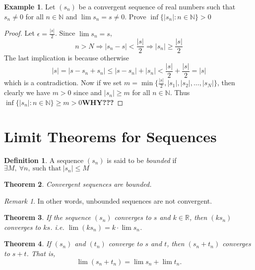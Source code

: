 \documentclass[12pt, lettersize]{book}
\theoremstyle{plain}
\newtheorem{thm}{Theorem}[section]
\theoremstyle{definition}
\newtheorem{dfn}[thm]{Definition}
\newtheorem*{eg}{Example}
\theoremstyle{remark}
\newtheorem*{rem}{Remark}
\begin{document}
	\begin{eg}
		Let $(s_n)$ be a convergent sequence of real numbers such that $s_n\neq0$ for all $n\in \mathbb{N}$ and $\lim s_n=s
		\neq0$. Prove $\inf\{|s_n|: n\in\mathbb{N}\}>0$
	\end{eg}
	\begin{proof}
		Let $\epsilon=\frac{|s|}{2}$. Since $\lim s_n=s$,
		\begin{displaymath}
			n>N \Rightarrow |s_n-s|<\frac{|s|}{2} \Rightarrow |s_n|\geq\frac{|s|}{2}
		\end{displaymath}
		The last implication is because otherwise 
		\begin{displaymath}
			|s|=|s-s_n+s_n|\leq|s-s_n|+|s_n|<\frac{|s|}{2}+\frac{|s|}{2}=|s|
		\end{displaymath}
		which is a contradiction. Now if we set $m=\min\{\frac{|s|}{2},|s_1|,|s_2|,\dots,|s_N|\}$, then clearly we have
		$m>0$ since and $|s_n|\geq m$ for all $n\in \mathbb{N}$. Thus $\inf\{|s_n|: n\in\mathbb{N}\}\geq m>0$\textbf{WHY???} 
	\end{proof}
	\newpage
	
	\section{Limit Theorems for Sequences}
	\begin{dfn}\label{def:bound}
		A sequence $(s_n)$ is said to be \emph{bounded} if $\exists M,\ \forall n,\ \text{such that}\ |s_n|\leq M$
	\end{dfn}
	
	\begin{thm}\label{def:convergence is bounded}
		Convergent sequences are bounded.
	\end{thm}
	\begin{rem}
		In other words, unbounded sequences are not convergent.
	\end{rem}
	
	\begin{thm}
		If the sequence $(s_n)$ converges to $s$ and $k\in\mathbb{R}$, then $(ks_n)$ converges to $ks$. i.e. $\lim(ks_n)=k\cdot\lim s_n$.
	\end{thm}
	
	\begin{thm}\label{def:addition}
		If $(s_n)$ and $(t_n)$ converge to $s$ and $t$, then $(s_n+t_n)$ converges to $s+t$. That is,
		\begin{displaymath}
			\lim(s_n+t_n)=\lim s_n+\lim t_n.
		\end{displaymath} 
	\end{thm}
	
\end{document}
